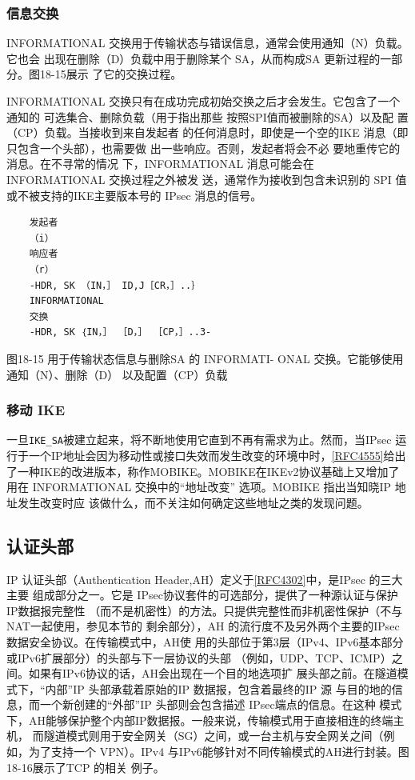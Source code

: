 \subsubsection{信息交换}
INFORMATIONAL 交换用于传输状态与错误信息，通常会使用通知（N）负载。它也会
出现在删除（D）负载中用于删除某个 SA，从而构成SA 更新过程的一部分。图18-15展示
了它的交换过程。

INFORMATIONAL 交换只有在成功完成初始交换之后才会发生。它包含了一个通知的
可选集合、删除负载（用于指出那些
按照SPI值而被删除的SA）以及配
置（CP）负载。当接收到来自发起者
的任何消息时，即使是一个空的IKE
消息（即只包含一个头部），也需要做
出一些响应。否则，发起者将会不必
要地重传它的消息。在不寻常的情况
下，INFORMATIONAL 消息可能会在
INFORMATIONAL 交换过程之外被发
送，通常作为接收到包含未识别的 SPI
值或不被支持的IKE主要版本号的
IPsec 消息的信号。

\begin{verbatim}
    发起者
    （i）
    响应者
    （r）
    -HDR, SK （IN，］ ID,J［CR，］..｝
    INFORMATIONAL
    交换
    -HDR, SK ｛IN，］ ［D，］ ［CP，］..3-
\end{verbatim}

图18-15 用于传输状态信息与删除SA 的 INFORMATI-
ONAL 交换。它能够使用通知（N）、删除（D）
以及配置（CP）负载

\subsubsection{移动 IKE}

一旦\verb|IKE_SA|被建立起来，将不断地使用它直到不再有需求为止。然而，当IPsec
运行于一个IP地址会因为移动性或接口失效而发生改变的环境中时，\href{https://www.rfc-editor.org/rfc/rfc4555}{[RFC4555]}给出
了一种IKE的改进版本，称作MOBIKE。MOBIKE在IKEv2协议基础上又增加了用在
INFORMATIONAL 交换中的“地址改变” 选项。MOBIKE 指出当知晓IP 地址发生改变时应
该做什么，而不关注如何确定这些地址之类的发现问题。

\subsection{认证头部}
IP 认证头部（Authentication Header,AH）定义于\href{https://www.rfc-editor.org/rfc/rfc4302}{[RFC4302]}中，是IPsec 的三大主要
组成部分之一。它是 IPsec协议套件的可选部分，提供了一种源认证与保护 IP数据报完整性
（而不是机密性）的方法。只提供完整性而非机密性保护（不与NAT一起使用，参见本节的
剩余部分），AH 的流行度不及另外两个主要的IPsec 数据安全协议。在传输模式中，AH使
用的头部位于第3层（IPv4、IPv6基本部分或IPv6扩展部分）的头部与下一层协议的头部
（例如，UDP、TCP、ICMP）之间。如果有IPv6协议的话，AH会出现在一个目的地选项扩
展头部之前。在隧道模式下，“内部”IP 头部承载着原始的IP 数据报，包含着最终的IP 源
与目的地的信息，而一个新创建的“外部”IP 头部则会包含描述 IPsec端点的信息。在这种
模式下，AH能够保护整个内部IP数据报。一般来说，传输模式用于直接相连的终端主机，
而隧道模式则用于安全网关（SG）之间，或一台主机与安全网关之间（例如，为了支持一个
VPN）。IPv4 与IPv6能够针对不同传输模式的AH进行封装。图18-16展示了TCP 的相关
例子。


